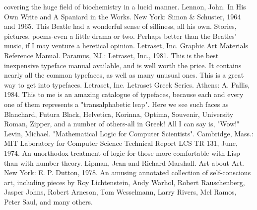   covering the huge field of biochemistry in a lucid manner.
Lennon, John. In His Own Write and A Spaniard in the Works. New York: Simon \&
  Schuster, 1964 and 1965. This Beatle had a wonderful sense of silliness, all his own.
  Stories, pictures, poems-even a little drama or two. Perhaps better than the Beatles' music, if
  I may venture a heretical opinion.
Letraset, Inc. Graphic Art Materials Reference Manual. Paramus, NJ.: Letraset, Inc., 1981.
  This is the best inexpensive typeface manual available, and is well worth the price. It
  contains nearly all the common typefaces, as well as many unusual ones. This is a great way
  to get into typefaces.
Letraset, Inc. Letraset Greek Series. Athens: A. Pallis, 1984. This to me is an amazing
  catalogue of typefaces, because each and every one of them represents a "transalphabetic
  leap". Here we see such faces as Blanchard, Futura Black, Helvetica, Korinna, Optima,
  Souvenir, University Roman, Zipper, and a number of others-all in Greek! All I can say is,
  "Wow!"
Levin, Michael. "Mathematical Logic for Computer Scientists". Cambridge, Mass.: MIT
  Laboratory for Computer Science Technical Report LCS TR 131, June, 1974. An
  unorthodox treatment of logic for those more comfortable with Lisp than with number
  theory.
Lipman, Jean and Richard Marshall. Art about Art. New York: E. P. Dutton, 1978. An
  amusing annotated collection of self-conscious art, including pieces by Roy Lichtenstein,
  Andy Warhol, Robert Rauschenberg, Jasper Johns, Robert Arneson, Tom Wesselmann,
  Larry Rivers, Mel Ramos, Peter Saul, and many others.



